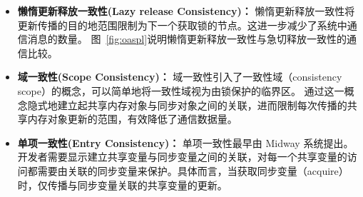 {\begin{itemize}
        \item \textbf{懒惰更新释放一致性(Lazy release Consistency)：} 懒惰更新释放一致性将更新传播的目的地范围限制为下一个获取锁的节点。这进一步减少了系统中通信消息的数量。
              图~\ref{fig:oaspl}说明懒惰更新释放一致性与急切释放一致性的通信比较。

        \item \textbf{域一致性(Scope Consistency)：} 域一致性引入了一致性域（consistency scope）的概念，可以简单地将一致性域视为由锁保护的临界区。
              通过这一概念隐式地建立起共享内存对象与同步对象之间的关联，进而限制每次传播的共享内存对象更新的范围，有效降低了通信数据量。

        \item \textbf{单项一致性(Entry Consistency)：} 单项一致性最早由 Midway 系统提出。开发者需要显示建立共享变量与同步变量之间的关联，对每一个共享变量的访问都需要由关联的同步变量来保护。具体而言，当获取同步变量（acquire）时，仅传播与同步变量关联的共享变量的更新。
    \end{itemize}

}
